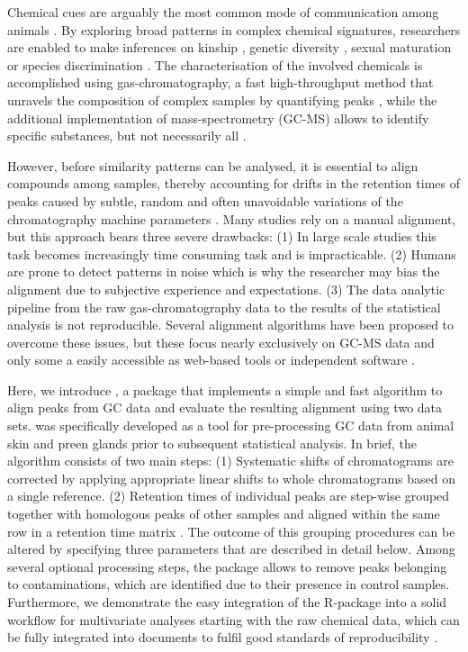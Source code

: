 Chemical cues are arguably the most common mode of communication among
animals \citep{Wyatt.2014}. By exploring broad patterns in complex
chemical signatures, researchers are enabled to make inferences on
kinship \citep{Krause.2012, Stoffel.2015}, genetic diversity
\citep{Charpentier.2010, Leclaire.2012}, sexual maturation
\citep{Caspers.2011} or species discrimination
\citep{Meulemeester.2011}. The characterisation of the involved
chemicals is accomplished using gas-chromatography, a fast
high-throughput method that unravels the composition of complex samples
by quantifying peaks \citep{McNair.2011}, while the additional
implementation of mass-spectrometry (GC-MS) allows to identify specific
substances, but not necessarily all \citep{Caspers.2011}. \par
However, before similarity patterns can be analysed, it is essential to
align compounds among samples, thereby accounting for drifts in the
retention times of peaks caused by subtle, random and often unavoidable
variations of the chromatography machine parameters \citep{Pierce.2005}.
Many studies rely on a manual alignment, but this approach bears three
severe drawbacks: (1) In large scale studies this task becomes
increasingly time consuming task and is impracticable. (2) Humans are
prone to detect patterns in noise which is why the researcher may bias
the alignment due to subjective experience and expectations. (3) The
data analytic pipeline from the raw gas-chromatography data to the
results of the statistical analysis is not reproducible. Several
alignment algorithms have been proposed to overcome these issues, but
these focus nearly exclusively on GC-MS data
\citep{Pierce.2005, Robinson.2007,Jiang.2013} and only some a easily
accessible as web-based tools \citep{Hoffmann.2009, Wang.2010} or
independent software \citep{Dellicour.2013}. \par
Here, we introduce , a package that implements a simple
and fast algorithm to align peaks from GC data and evaluate the
resulting alignment using two data sets.  was specifically
developed as a tool for pre-processing GC data from animal skin and
preen glands prior to subsequent statistical analysis. In brief, the
algorithm consists of two main steps: (1) Systematic shifts of
chromatograms are corrected by applying appropriate linear shifts to
whole chromatograms based on a single reference. (2) Retention times of
individual peaks are step-wise grouped together with homologous peaks of
other samples and aligned within the same row in a retention time matrix
. The outcome of this grouping procedures can be altered by specifying
three parameters that are described in detail below. Among several
optional processing steps, the package allows to remove peaks belonging
to contaminations, which are identified due to their presence in control
samples. Furthermore, we demonstrate the easy integration of the
R-package
\href{https://cran.r-project.org/web/packages/vegan/index.html}{}
\citep{Oksanen.2016} into a solid workflow for multivariate analyses
starting with the raw chemical data, which can be fully integrated into
 documents \citep{Allaire.2016} to fulfil good
standards of reproducibility \citep{Peng.2011}.

